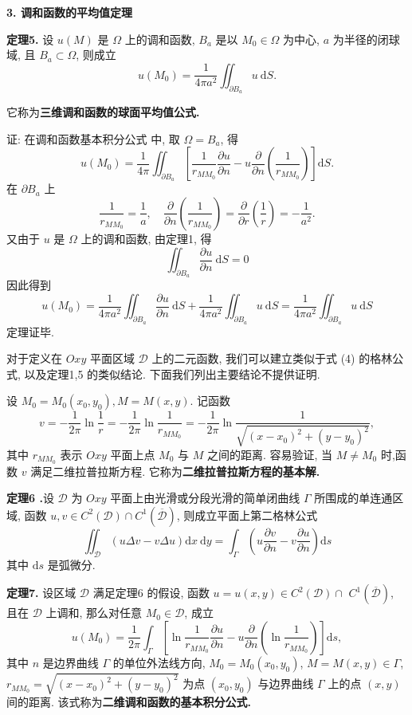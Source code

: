 \textbf{3. 调和函数的平均值定理}

\textbf{定理5. }设 $ u(M) $ 是 $ \Omega $ 上的调和函数, $ B_{a} $ 是以 $ M_{0} \in \Omega $ 为中心, $ a $ 为半径的闭球域, 且 $ B_{a} \subset \Omega $, 则成立
$$
u\left(M_{0}\right)=\frac{1}{4 \pi a^{2}} \iint_{\partial B_{a}} u \mathrm{~d} S .
$$

它称为\textbf{三维调和函数的球面平均值公式.}

证: 在调和函数基本积分公式 中, 取 $ \Omega=B_{a} $, 得
$$
u\left(M_{0}\right)=\frac{1}{4 \pi} \iint_{\partial B_{a}}\left[\frac{1}{r_{M M_{0}}} \frac{\partial u}{\partial n}-u \frac{\partial}{\partial n}\left(\frac{1}{r_{M M_{0}}}\right)\right] \mathrm{d} S .
$$
在 $ \partial B_{a} $ 上
$$
\frac{1}{r_{M M_{0}}}=\frac{1}{a}, \quad \frac{\partial}{\partial n}\left(\frac{1}{r_{M M_{0}}}\right)=\frac{\partial}{\partial r}\left(\frac{1}{r}\right)=-\frac{1}{a^{2}} .
$$
又由于 $ u $ 是 $ \Omega $ 上的调和函数, 由定理1, 得
$$
\iint_{\partial B_{a}} \frac{\partial u}{\partial n} \mathrm{~d} S=0
$$
因此得到
$$
u\left(M_{0}\right)=\frac{1}{4 \pi a^{2}} \iint_{\partial B_{a}} \frac{\partial u}{\partial n} \mathrm{~d} S+\frac{1}{4 \pi a^{2}} \iint_{\partial B_{a}} u \mathrm{~d} S=\frac{1}{4 \pi a^{2}} \iint_{\partial B_{a}} u \mathrm{~d} S
$$
定理证毕.

对于定义在 $ O x y $ 平面区域 $ \mathcal{D} $ 上的二元函数, 我们可以建立类似于式 (4) 的格林公式, 以及定理1,5 的类似结论. 下面我们列出主要结论不提供证明.

设 $ M_{0}=M_{0}\left(x_{0}, y_{0}\right), M=M(x, y) $. 记函数
$$
v=-\frac{1}{2 \pi} \ln \frac{1}{r}=-\frac{1}{2 \pi} \ln \frac{1}{r_{M M_{0}}}=-\frac{1}{2 \pi} \ln \frac{1}{\sqrt{\left(x-x_{0}\right)^{2}+\left(y-y_{0}\right)^{2}}},
$$
其中 $ r_{M M_{0}} $ 表示 $ O x y $ 平面上点 $ M_{0} $ 与 $ M $ 之间的距离. 容易验证, 当 $ M \neq M_{0} $ 时,函数 $ v $ 满足二维拉普拉斯方程. 它称为\textbf{二维拉普拉斯方程的基本解.}

\textbf{定理6 .}设 $ \mathcal{D} $ 为 $ O x y $ 平面上由光滑或分段光滑的简单闭曲线 $ \Gamma $ 所围成的单连通区域, 函数 $ u, v \in C^{2}(\mathcal{D}) \cap C^{1}(\overline{\mathcal{D}}) $, 则成立平面上第二格林公式
$$
\iint_{\mathcal{D}}(u \Delta v-v \Delta u) \mathrm{d} x \mathrm{~d} y=\int_{\Gamma}\left(u \frac{\partial v}{\partial n}-v \frac{\partial u}{\partial n}\right) \mathrm{d} s
$$
其中 $ \mathrm{d} s $ 是弧微分.

\textbf{定理7.} 设区域 $ \mathcal{D} $ 满足定理6 的假设, 函数 $ u=u(x, y) \in C^{2}(\mathcal{D}) \cap $ $ C^{1}(\overline{\mathcal{D}}) $, 且在 $ \mathcal{D} $ 上调和, 那么对任意 $ M_{0} \in \mathcal{D} $, 成立
$$
u\left(M_{0}\right)=\frac{1}{2 \pi} \int_{\Gamma}\left[\ln \frac{1}{r_{M M_{0}}} \frac{\partial u}{\partial n}-u \frac{\partial}{\partial n}\left(\ln \frac{1}{r_{M M_{0}}}\right)\right] \mathrm{d} s,
$$
其中 $ n $ 是边界曲线 $ \Gamma $ 的单位外法线方向, $ M_{0}=M_{0}\left(x_{0}, y_{0}\right)$, $M=M(x, y) \in \Gamma $, $ r_{M M_{0}}=\sqrt{\left(x-x_{0}\right)^{2}+\left(y-y_{0}\right)^{2}} $ 为点 $ \left(x_{0}, y_{0}\right) $ 与边界曲线 $ \Gamma $ 上的点 $ (x, y) $ 间的距离. 该式称为\textbf{二维调和函数的基本积分公式.}

